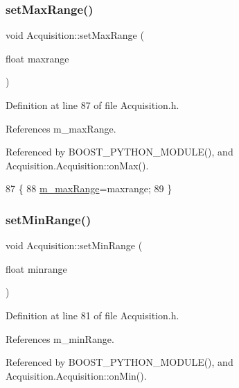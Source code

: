 \subsubsection{\texorpdfstring{set\+Max\+Range()}{setMaxRange()}}
{\footnotesize\ttfamily void Acquisition\+::set\+Max\+Range (\begin{DoxyParamCaption}\item[{float}]{maxrange }\end{DoxyParamCaption})\hspace{0.3cm}{\ttfamily [inline]}}



Definition at line 87 of file Acquisition.\+h.



References m\+\_\+max\+Range.



Referenced by B\+O\+O\+S\+T\+\_\+\+P\+Y\+T\+H\+O\+N\+\_\+\+M\+O\+D\+U\+L\+E(), and Acquisition.\+Acquisition\+::on\+Max().


\begin{DoxyCode}
87                                   \{
88     \hyperlink{classAcquisition_a45478629e9db582470b4b158edb46616}{m\_maxRange}=maxrange;
89   \}
\end{DoxyCode}
\mbox{\label{classAcquisition_a8a15ffc6e539a3ae12efe4bea1ca7587}} 
\subsubsection{\texorpdfstring{set\+Min\+Range()}{setMinRange()}}
{\footnotesize\ttfamily void Acquisition\+::set\+Min\+Range (\begin{DoxyParamCaption}\item[{float}]{minrange }\end{DoxyParamCaption})\hspace{0.3cm}{\ttfamily [inline]}}



Definition at line 81 of file Acquisition.\+h.



References m\+\_\+min\+Range.



Referenced by B\+O\+O\+S\+T\+\_\+\+P\+Y\+T\+H\+O\+N\+\_\+\+M\+O\+D\+U\+L\+E(), and Acquisition.\+Acquisition\+::on\+Min().


